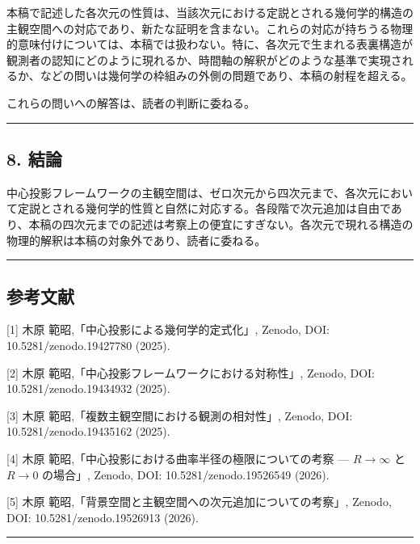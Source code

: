 \documentclass[a4paper,11pt]{ltjsarticle}
\theoremstyle{definition}
\begin{document}
本稿で記述した各次元の性質は、当該次元における定説とされる幾何学的構造の主観空間への対応であり、新たな証明を含まない。これらの対応が持ちうる物理的意味付けについては、本稿では扱わない。特に、各次元で生まれる表裏構造が観測者の認知にどのように現れるか、時間軸の解釈がどのような基準で実現されるか、などの問いは幾何学の枠組みの外側の問題であり、本稿の射程を超える。

これらの問いへの解答は、読者の判断に委ねる。

\begin{center}\rule{0.5\linewidth}{0.5pt}\end{center}

\subsection{8. 結論}\label{ux7d50ux8ad6}

中心投影フレームワークの主観空間は、ゼロ次元から四次元まで、各次元において定説とされる幾何学的性質と自然に対応する。各段階で次元追加は自由であり、本稿の四次元までの記述は考察上の便宜にすぎない。各次元で現れる構造の物理的解釈は本稿の対象外であり、読者に委ねる。

\begin{center}\rule{0.5\linewidth}{0.5pt}\end{center}

\subsection{参考文献}\label{ux53c2ux8003ux6587ux732e}

{[}1{]} 木原 範昭,「中心投影による幾何学的定式化」, Zenodo, DOI: 10.5281/zenodo.19427780 (2025).

{[}2{]} 木原 範昭,「中心投影フレームワークにおける対称性」, Zenodo, DOI: 10.5281/zenodo.19434932 (2025).

{[}3{]} 木原 範昭,「複数主観空間における観測の相対性」, Zenodo, DOI: 10.5281/zenodo.19435162 (2025).

{[}4{]} 木原 範昭,「中心投影における曲率半径の極限についての考察 --- \(R \to \infty\) と \(R \to 0\) の場合」, Zenodo, DOI: 10.5281/zenodo.19526549 (2026).

{[}5{]} 木原 範昭,「背景空間と主観空間への次元追加についての考察」, Zenodo, DOI: 10.5281/zenodo.19526913 (2026).

\begin{center}\rule{0.5\linewidth}{0.5pt}\end{center}
\end{document}
